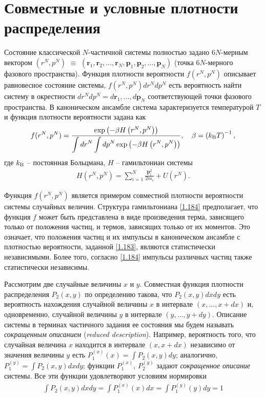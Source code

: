 \documentclass[14pt]{extarticle}
\newcommand{\vr}{\mathbf{r}}
\newcommand{\vp}{\mathbf{p}}
\newcommand{\kB}{k_\textup{B}}
\newcommand{\lb}{\left(}
\newcommand{\rb}{\right)}
\begin{document}
\section{Совместные и условные плотности распределения}

Состояние классической $N$-частичной системы полностью задано $6N$-мерным вектором $(r^N, p^N)$ $\equiv$ $(\vr_1, \vr_2, \dots, \vr_N, \vp_1, \vp_2, \dots, \vp_N)$ (точка $6N$-мерного фазового пространства). Функция плотности вероятности $f(r^N, p^N)$ описывает равновесное состояние системы, $f(r^N, p^N) dr^N dp^N$ есть вероятность найти систему в окрестности $dr^N dp^N = d\vr_1, \dots, d\vp_N$ соответствующей точки фазового пространства. В каноническом ансамбле система характеризуется температурой $T$ и функция плотности вероятности задана как
\begin{gather}
		f(r^N, p^N) = \frac{\exp \lb - \beta H \lb r^N, p^N \rb \rb }{\displaystyle \int dr^N \int dp^N \exp \lb -\beta H \lb r^N, p^N \rb \rb}, \quad  \beta = \lb \kB T \rb^{-1}, \label{1.183} 
\end{gather}
где $\kB$ -- постоянная Больцмана, $H$ -- гамильтониан системы
\begin{gather}
		H(r^N, p^N) = \sum_{i = 1}^{N} \frac{\vp_i^2}{2 m_i} + U \lb r^N \rb. \label{1.184}
\end{gather}

Функция $f(r^N, p^N)$ является примером совместной плотности вероятности системы случайных величин. Структура гамильтониана \eqref{1.184} предполагает, что функция $f$ может быть представлена в виде произведения терма, зависящего только от положения частиц, и термов, зависящих только от их моментов. Это означает, что положения частиц и их импульсы в каноническом ансамбле с плотностью вероятности, заданной \eqref{1.183}, являются статистически независимыми. Более того, согласно \eqref{1.184} импульсы различных частиц также статистически независимы. \par
Рассмотрим две случайные величины $x$ и $y$. Совместная функция плотности распределения $P_2(x, y)$ по определению такова, что $P_2(x, y) dx dy$ есть вероятность нахождения случайной величины $x$ в интервале $(x, \dots, x + dx)$ и, одновременно, случайной величины $y$ в интервале $(y, \dots, y + dy)$. Описание системы в терминах частичного задания ее состояния мы будем называть \textit{сокращенным описанием} (\textit{reduced description}). Например, вероятность того, что случайная величина $x$ находится в интервале $(x, x + dx)$ независимо от значения величины $y$ есть $P_1^{(x)}(x) = \int P_2(x, y) dy$; аналогично, $P_1^{(y)} = \int P_2(x, y)dx dy$; функции $P_1^{(x)}$, $P_2^{(y)}$ задают \textit{сокращенное описание} системы. Все эти функции удовлетворяют условиям нормировки
\begin{gather}
	\int P_2(x, y) dx dy = \int P_1^{(x)} (x) dx = \int P_1^{(y)}(y) dy = 1 \label{1.185}
\end{gather}
\end{document}
